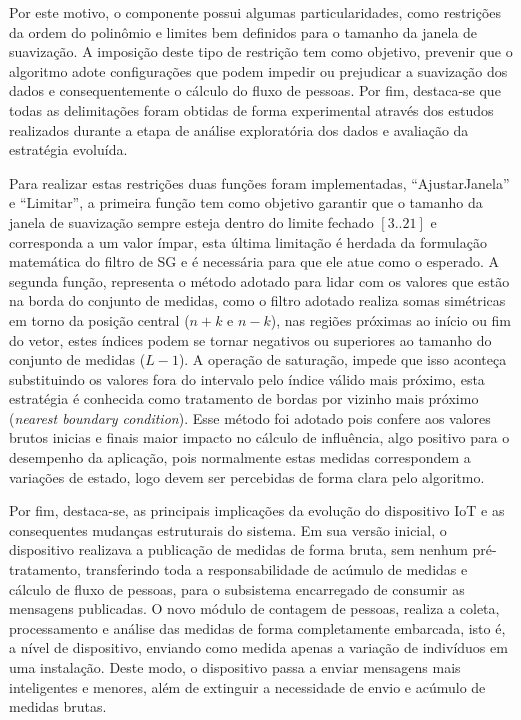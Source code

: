 Por este motivo, o componente possui algumas particularidades, como restrições da ordem do polinômio e limites bem definidos para o tamanho da janela de suavização. A imposição deste tipo de restrição tem como objetivo, prevenir que o algoritmo adote configurações que podem impedir ou prejudicar a suavização dos dados e consequentemente o cálculo do fluxo de pessoas. Por fim, destaca-se que todas as delimitações foram obtidas de forma experimental através dos estudos realizados durante a etapa de análise exploratória dos dados e avaliação da estratégia evoluída. 


Para realizar estas restrições duas funções foram implementadas, ``AjustarJanela'' e ``Limitar'', a primeira função tem como objetivo garantir que o tamanho da janela de suavização sempre esteja dentro do limite fechado $[3..21]$ e corresponda a um valor ímpar, esta última limitação é herdada da formulação matemática do filtro de SG e é necessária para que ele atue como o esperado. A segunda função, representa o método adotado para lidar com os valores que estão na borda do conjunto de medidas, como o filtro adotado realiza somas simétricas em torno da posição central ($n+k$ e $n-k$), nas regiões próximas ao início ou fim do vetor, estes índices podem se tornar negativos ou superiores ao tamanho do conjunto de medidas ($L-1$). A operação de saturação, impede que isso aconteça substituindo os valores fora do intervalo pelo índice válido mais próximo, esta estratégia é conhecida como tratamento de bordas por vizinho mais próximo (\textit{nearest boundary condition}). Esse método foi adotado pois confere aos valores brutos inicias e finais maior impacto no cálculo de influência, algo positivo para o desempenho da aplicação, pois normalmente estas medidas correspondem a variações de estado, logo devem ser percebidas de forma clara pelo algoritmo. 

Por fim, destaca-se, as principais implicações da evolução do dispositivo IoT e as consequentes mudanças estruturais do sistema. Em sua versão inicial, o dispositivo realizava a publicação de medidas de forma bruta, sem nenhum pré-tratamento, transferindo toda a responsabilidade de acúmulo de medidas e cálculo de fluxo de pessoas, para o subsistema encarregado de consumir as mensagens publicadas. O novo módulo de contagem de pessoas, realiza a coleta, processamento e análise das medidas de forma completamente embarcada, isto é, a nível de dispositivo, enviando como medida apenas a variação de indivíduos em uma instalação. Deste modo, o dispositivo passa a enviar mensagens mais inteligentes \cite{motta_evidence-based_2023} e menores, além de extinguir a necessidade de envio e acúmulo de medidas brutas.

